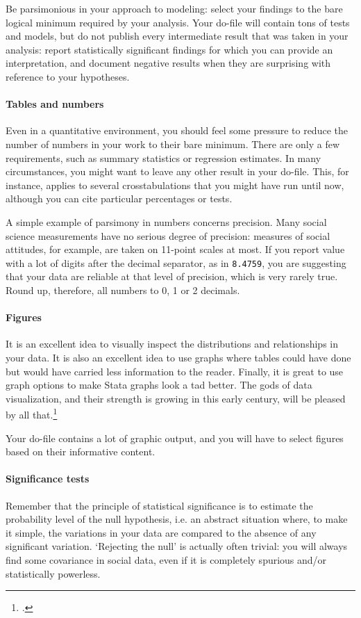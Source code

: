 Be parsimonious in your approach to modeling: select your findings to the bare logical minimum required by your analysis. Your do-file will contain tons of tests and models, but do not publish every intermediate result that was taken in your analysis: report statistically significant findings for which you can provide an interpretation, and document negative results when they are surprising with reference to your hypotheses.

\paragraph{Tables and numbers} Even in a quantitative environment, you should feel some pressure to reduce the number of numbers in your work to their bare minimum. There are only a few requirements, such as summary statistics or regression estimates. In many circumstances, you might want to leave any other result in your do-file. This, for instance, applies to several crosstabulations that you might have run until now, although you can cite particular percentages or tests.

A simple example of parsimony in numbers concerns precision. Many social science measurements have no serious degree of precision: measures of social attitudes, for example, are taken on 11-point scales at most. If you report value with a lot of digits after the decimal separator, as in \texttt{8.4759}, you are suggesting that your data are reliable at that level of precision, which is very rarely true. Round up, therefore, all numbers to 0, 1 or 2 decimals.

\paragraph{Figures} It is an excellent idea to visually inspect the distributions and relationships in your data. It is also an excellent idea to use graphs where tables could have done but would have carried less information to the reader. Finally, it is great to use graph options to make Stata graphs look a tad better. The gods of data visualization, and their strength is growing in this early century, will be pleased by all that.\footcite{Tufte:2001t}

Your do-file contains a lot of graphic output, and you will have to select figures based on their informative content.

\paragraph{Significance tests} Remember that the principle of statistical significance is to estimate the probability level of the null hypothesis, i.e. an abstract situation where, to make it simple, the variations in your data are compared to the absence of any significant variation. `Rejecting the null' is actually often trivial: you will always find some covariance in social data, even if it is completely spurious and/or statistically powerless.

